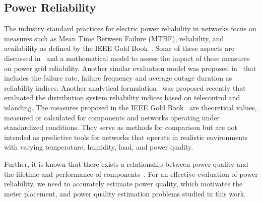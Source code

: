 \subsection{Power Reliability}



The industry standard practices for electric power reliability in networks focus on measures such as Mean Time Between Failure (MTBF), reliability, and availability as defined by the IEEE Gold Book~\cite{goldbook}. Some of these aspects are discussed in~\cite{falahati2013reliability} and a mathematical model to assess the impact of these measures on power grid reliability. Another similar evaluation model was proposed in~\cite{wang2010reliability} that includes the failure rate, failure frequency and
average outage duration as reliability indices. Another analytical formulation~\cite{conti2014reliability} was proposed recently that evaluated the distribution system reliability indices based on telecontrol and islanding. The measures proposed in the IEEE Gold Book~\cite{goldbook} are theoretical values, measured or calculated for components and networks operating under standardized conditions. They serve as methods for comparison but are not intended as predictive tools for networks that operate in realistic environments with varying temperature, humidity, load, and power quality.

Further, it is known that there exists a relationship between power quality and the lifetime and performance of components~\cite{iti_curve}. For an effective evaluation of power reliability, we need to accurately estimate power quality, which motivates the meter placement, and power quality estimation problems studied in this work.

